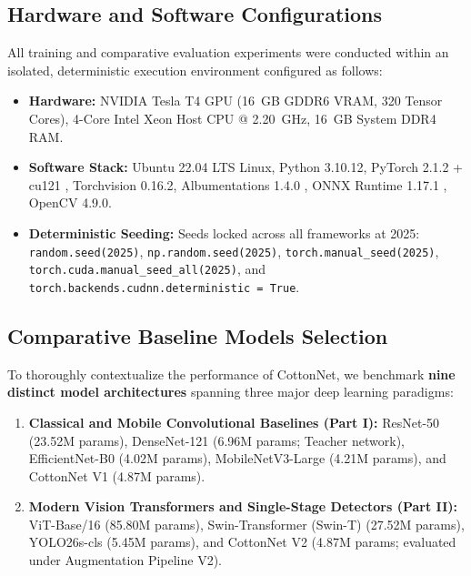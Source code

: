 \documentclass[journal,10pt,twocolumn]{IEEEtran}
\begin{document}
\subsection{Hardware and Software Configurations}
All training and comparative evaluation experiments were conducted within an isolated, deterministic execution environment configured as follows:
\begin{itemize}[leftmargin=*]
    \item \textbf{Hardware:} NVIDIA Tesla T4 GPU (16~GB GDDR6 VRAM, 320 Tensor Cores), 4-Core Intel Xeon Host CPU @ 2.20~GHz, 16~GB System DDR4 RAM.
    \item \textbf{Software Stack:} Ubuntu 22.04 LTS Linux, Python 3.10.12, PyTorch 2.1.2 + cu121 \cite{paszke2019pytorch}, Torchvision 0.16.2, Albumentations 1.4.0 \cite{buslaev2020albumentations}, ONNX Runtime 1.17.1 \cite{onnx2019}, OpenCV 4.9.0.
    \item \textbf{Deterministic Seeding:} Seeds locked across all frameworks at 2025: \texttt{random.seed(2025)}, \texttt{np.random.seed(2025)}, \texttt{torch.manual\_seed(2025)}, \texttt{torch.cuda.manual\_seed\_all(2025)}, and \texttt{torch.backends.cudnn.deterministic = True}.
\end{itemize}

\subsection{Comparative Baseline Models Selection}
To thoroughly contextualize the performance of CottonNet, we benchmark \textbf{nine distinct model architectures} spanning three major deep learning paradigms:
\begin{enumerate}[leftmargin=*]
    \item \textbf{Classical and Mobile Convolutional Baselines (Part I):} ResNet-50 \cite{he2016deep} (23.52M params), DenseNet-121 \cite{huang2017densely} (6.96M params; Teacher network), EfficientNet-B0 \cite{tan2019efficientnet} (4.02M params), MobileNetV3-Large \cite{howard2019searching} (4.21M params), and CottonNet V1 (4.87M params).
    \item \textbf{Modern Vision Transformers and Single-Stage Detectors (Part II):} ViT-Base/16 \cite{dosovitskiy2021image} (85.80M params), Swin-Transformer (Swin-T) \cite{liu2021swin} (27.52M params), YOLO26s-cls \cite{jocher2023yolo} (5.45M params), and CottonNet V2 (4.87M params; evaluated under Augmentation Pipeline V2).
\end{enumerate}
\end{document}

